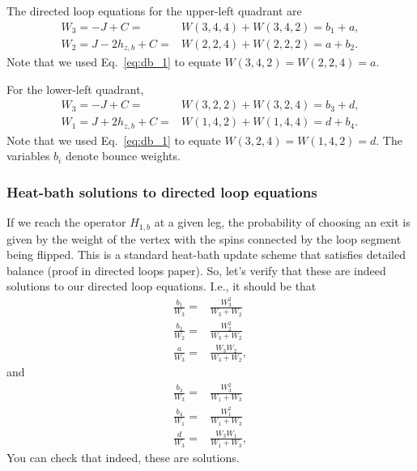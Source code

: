 \documentclass[12pt]{article}
\begin{document}
The directed loop equations for the upper-left quadrant are
\begin{subequations} \label{eq:directed_loop_eq1}
    \begin{align}
        W_3 = -J + C =& W(3,4,4) + W(3,4,2) = b_1 + a, \\
        W_2 = J - 2h_{z,b} + C =& W(2,2,4) + W(2,2,2) = a + b_2.
    \end{align}
\end{subequations}
Note that we used Eq.~\ref{eq:db_1} to equate $W(3,4,2) = W(2,2,4) = a$.

For the lower-left quadrant, 
\begin{subequations} \label{eq:directed_loop_eq2}
    \begin{align}
        W_3 = -J + C =& W(3,2,2) + W(3,2,4) = b_3 + d, \\
        W_1 = J + 2h_{z,b} + C =& W(1,4,2) + W(1,4,4) = d + b_4.
    \end{align}
\end{subequations}
Note that we used Eq.~\ref{eq:db_1} to equate $W(3,2,4) = W(1,4,2) = d$.
The variables $b_i$ denote bounce weights.

\subsubsection{Heat-bath solutions to directed loop equations}

If we reach the operator $H_{1,b}$ at a given leg, the probability of choosing an exit is given by the weight of the vertex with the spins connected by the loop segment being flipped. 
This is a standard heat-bath update scheme that satisfies detailed balance (proof in directed loops paper).
So, let's verify that these are indeed solutions to our directed loop equations.
I.e., it should be that
\begin{align*}
    \frac{b_1}{W_3} =& \frac{W_3^2}{W_3 + W_2} \\
    \frac{b_2}{W_2} =& \frac{W_2^2}{W_3 + W_2} \\
    \frac{a}{W_3} =& \frac{W_3 W_2}{W_3 + W_2},
\end{align*}
and
\begin{align*}
    \frac{b_3}{W_3} =& \frac{W_3^2}{W_1 + W_3} \\
    \frac{b_4}{W_1} =& \frac{W_1^2}{W_1 + W_3} \\
    \frac{d}{W_3} =& \frac{W_3 W_1}{W_1 + W_3},
\end{align*}
You can check that indeed, these are solutions.
\end{document}
